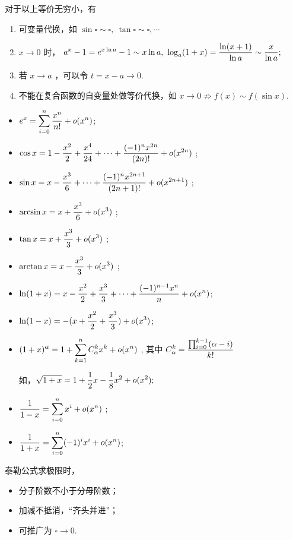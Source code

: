 对于以上等价无穷小，有

\begin{enumerate}
    \item 可变量代换，如 $ \sin \square \sim \square,\ \tan \square \sim \square,\cdots $ 
    \item $ x\rightarrow0 $ 时，
    $\dis a^x-1=e^{x\ln a} -1\sim x\ln a,\ \log_a(1+x)=\frac{\ln(x+1)}{\ln a}\sim \frac{x}{\ln a};$
    \item 若 $ x\rightarrow a $ ，可以令 $ t = x - a \rightarrow 0. $ 
    \item 不能在复合函数的自变量处做等价代换，如 $ x\rightarrow 0\nRightarrow f(x)\sim f(\sin x). $ 
\end{enumerate}


\begin{itemize}
    \item $\displaystyle e^x = \sum_{i=0}^n \dfrac{x^n}{n!}+ o(x^n)$;
    \item $\displaystyle \cos x = 1 - \frac{x^2}{2} + \dfrac{x^4}{24} +\dots + \frac{(-1)^{n}x^{2n}}{(2n)!} + o(x^{2n})$ ;
    \item $\displaystyle \sin x = x - \frac{x^3}{6} + \dots + \frac{(-1)^{n}x^{2n+1}}{(2n+1)!} + o(x^{2n+1}) $ ;
    \item $\displaystyle \arcsin x = x + \frac{x^3}{6} +o(x^3)$ ;
    \item $\displaystyle \tan x = x + \frac{x^3}{3} + o(x^3)$ ;
    \item $\displaystyle \arctan x = x - \frac{x^3}{3} + o(x^3)$ ;
    \item $\displaystyle \ln (1+x) = x - \frac{x^2}{2} + \frac{x^3}{3} + \dots + \frac{(-1)^{n-1}x^n}{n} + o(x^n) $;
    \item $\displaystyle \ln(1-x) = -(x+\frac{x^2}{2} + \frac{x^3}{3}) + o(x^3)$;
    \item $\displaystyle (1+x)^\alpha = 1+\sum_{k=1}^n C_\alpha^kx^k + o(x^n) $ ,
    其中 $\displaystyle C_\alpha^k=\frac{\prod_{i = 0}^{k-1}(\alpha - i)}{k!} $ 

    如，$ \displaystyle \sqrt{1+x} = 1 + \dfrac{1}{2}x - \dfrac{1}{8}x^2 + o(x^2); $ 
    \item $\displaystyle \frac{1}{1-x} = \sum_{i=0}^n x^i + o(x^n) $ ;
    \item $\displaystyle \frac{1}{1+x} = \sum_{i=0}^n (-1)^i x^i + o(x^n) $;
\end{itemize}

泰勒公式求极限时，\begin{itemize}
    \item 分子阶数不小于分母阶数；
    \item 加减不抵消，“齐头并进”；
    \item 可推广为 $ \square\rightarrow 0. $
\end{itemize}

